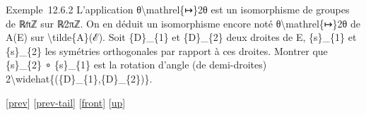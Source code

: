 \documentclass[]{article}
\begin{document}
Exemple~12.6.2 L'application θ\textbackslash{}mathrel\{↦\}2θ est un
isomorphisme de groupes de ℝ∕πℤ sur ℝ∕2πℤ. On en déduit un isomorphisme
encore noté θ\textbackslash{}mathrel\{↦\}2θ de A(E) sur
\textbackslash{}tilde\{A\}(ℰ). Soit \{D\}\_\{1\} et \{D\}\_\{2\} deux
droites de E, \{s\}\_\{1\} et \{s\}\_\{2\} les symétries orthogonales
par rapport à ces droites. Montrer que \{s\}\_\{2\} ∘ \{s\}\_\{1\} est
la rotation d'angle (de demi-droites)
2\textbackslash{}widehat\{(\{D\}\_\{1\},\{D\}\_\{2\})\}.

{[}\href{coursse71.html}{prev}{]}
{[}\href{coursse71.html\#tailcoursse71.html}{prev-tail}{]}
{[}\href{coursse72.html}{front}{]}
{[}\href{coursch13.html\#coursse72.html}{up}{]}
\end{document}
